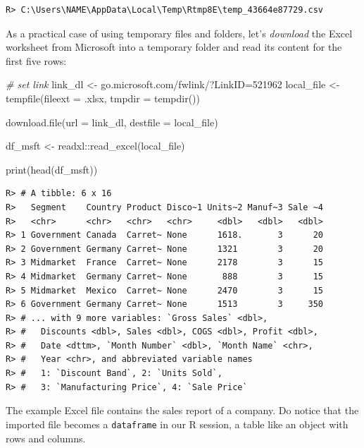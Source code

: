 \documentclass[
  12pt,
]{book}
\newenvironment{Shaded}{\begin{snugshade}}{\end{snugshade}}
\newcommand{\AttributeTok}[1]{\textcolor[rgb]{0.61,0.61,0.61}{#1}}
\newcommand{\CommentTok}[1]{\textcolor[rgb]{0.37,0.37,0.37}{\textit{#1}}}
\newcommand{\FunctionTok}[1]{\textcolor[rgb]{0,0,0}{#1}}
\newcommand{\NormalTok}[1]{#1}
\newcommand{\OtherTok}[1]{\textcolor[rgb]{0.37,0.37,0.37}{#1}}
\newcommand{\SpecialCharTok}[1]{\textcolor[rgb]{0,0,0}{#1}}
\newcommand{\StringTok}[1]{\textcolor[rgb]{0.5,0.5,0.5}{#1}}
\begin{document}
\begin{verbatim}
R> C:\Users\NAME\AppData\Local\Temp\Rtmp8E\temp_43664e87729.csv
\end{verbatim}

As a practical case of using temporary files and folders, let's \emph{download} the Excel worksheet from Microsoft into a temporary folder and read its content for the first five rows:

\begin{Shaded}
\begin{Highlighting}[]
\CommentTok{\# set link}
\NormalTok{link\_dl }\OtherTok{\textless{}{-}} \StringTok{\textquotesingle{}go.microsoft.com/fwlink/?LinkID=521962\textquotesingle{}}
\NormalTok{local\_file }\OtherTok{\textless{}{-}} \FunctionTok{tempfile}\NormalTok{(}\AttributeTok{fileext =} \StringTok{\textquotesingle{}.xlsx\textquotesingle{}}\NormalTok{, }\AttributeTok{tmpdir =} \FunctionTok{tempdir}\NormalTok{())}

\FunctionTok{download.file}\NormalTok{(}\AttributeTok{url =}\NormalTok{ link\_dl,}
              \AttributeTok{destfile =}\NormalTok{ local\_file)}

\NormalTok{df\_msft }\OtherTok{\textless{}{-}}\NormalTok{ readxl}\SpecialCharTok{::}\FunctionTok{read\_excel}\NormalTok{(local\_file)}

\FunctionTok{print}\NormalTok{(}\FunctionTok{head}\NormalTok{(df\_msft))}
\end{Highlighting}
\end{Shaded}

\begin{verbatim}
R> # A tibble: 6 x 16
R>   Segment    Country Product Disco~1 Units~2 Manuf~3 Sale ~4
R>   <chr>      <chr>   <chr>   <chr>     <dbl>   <dbl>   <dbl>
R> 1 Government Canada  Carret~ None      1618.       3      20
R> 2 Government Germany Carret~ None      1321        3      20
R> 3 Midmarket  France  Carret~ None      2178        3      15
R> 4 Midmarket  Germany Carret~ None       888        3      15
R> 5 Midmarket  Mexico  Carret~ None      2470        3      15
R> 6 Government Germany Carret~ None      1513        3     350
R> # ... with 9 more variables: `Gross Sales` <dbl>,
R> #   Discounts <dbl>, Sales <dbl>, COGS <dbl>, Profit <dbl>,
R> #   Date <dttm>, `Month Number` <dbl>, `Month Name` <chr>,
R> #   Year <chr>, and abbreviated variable names
R> #   1: `Discount Band`, 2: `Units Sold`,
R> #   3: `Manufacturing Price`, 4: `Sale Price`
\end{verbatim}

The example Excel file contains the sales report of a company. Do notice that the imported file becomes a \texttt{dataframe} in our R session, a table like an object with rows and columns.
\end{document}
